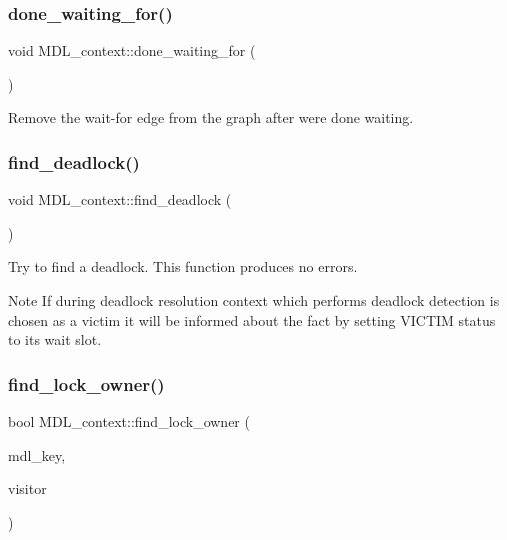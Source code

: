 \subsubsection{\texorpdfstring{done\+\_\+waiting\+\_\+for()}{done\_waiting\_for()}}
{\footnotesize\ttfamily void M\+D\+L\+\_\+context\+::done\+\_\+waiting\+\_\+for (\begin{DoxyParamCaption}{ }\end{DoxyParamCaption})\hspace{0.3cm}{\ttfamily [inline]}}

Remove the wait-\/for edge from the graph after we\textquotesingle{}re done waiting. \mbox{\label{classMDL__context_aa0e75a7f44e5bc687620aff289a00f52}} 
\subsubsection{\texorpdfstring{find\+\_\+deadlock()}{find\_deadlock()}}
{\footnotesize\ttfamily void M\+D\+L\+\_\+context\+::find\+\_\+deadlock (\begin{DoxyParamCaption}{ }\end{DoxyParamCaption})}

Try to find a deadlock. This function produces no errors.

\begin{DoxyNote}{Note}
If during deadlock resolution context which performs deadlock detection is chosen as a victim it will be informed about the fact by setting V\+I\+C\+T\+IM status to its wait slot. 
\end{DoxyNote}
\mbox{\label{classMDL__context_a7cf6eddf26617c84f0c2c21af8ec4a94}} 
\subsubsection{\texorpdfstring{find\+\_\+lock\+\_\+owner()}{find\_lock\_owner()}}
{\footnotesize\ttfamily bool M\+D\+L\+\_\+context\+::find\+\_\+lock\+\_\+owner (\begin{DoxyParamCaption}\item[{const \mbox{\hyperlink{structMDL__key}{M\+D\+L\+\_\+key}} $\ast$}]{mdl\+\_\+key,  }\item[{\mbox{\hyperlink{classMDL__context__visitor}{M\+D\+L\+\_\+context\+\_\+visitor}} $\ast$}]{visitor }\end{DoxyParamCaption})}

